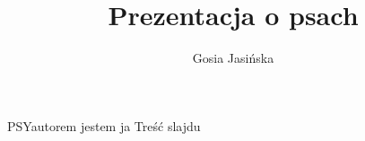 \documentclass{beamer}
\title{Prezentacja o psach}
\author{Gosia Jasińska}
\institute{UG}
\begin{document}
  \maketitle
  \begin{frame}{PSY}{autorem jestem ja}
    Treść slajdu
  \end{frame}
\end{document}

